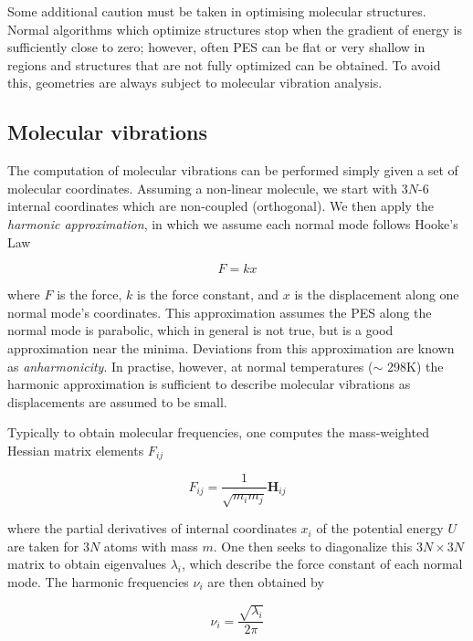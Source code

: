 Some additional caution must be taken in optimising molecular structures.
Normal algorithms which optimize structures stop when the gradient of energy is
sufficiently close to zero; however, often PES can be flat or very shallow in
regions and structures that are not fully optimized can be obtained. To avoid
this, geometries are always subject to molecular vibration analysis.

\subsection{Molecular vibrations}

The computation of molecular vibrations can be performed simply given a set of
molecular coordinates.\cite{Wilson1980} Assuming a non-linear molecule, we
start with 3$N$-6 internal coordinates which are non-coupled (orthogonal). We
then apply the \emph{harmonic approximation}, in which we assume each normal
mode follows Hooke's Law

\begin{equation}
  F = kx
\end{equation}


\noindent where $F$ is the force, $k$ is the force constant, and $x$ is the
displacement along one normal mode's coordinates. This approximation assumes
the PES along the normal mode is parabolic, which in general is not true, but
is a good approximation near the minima. Deviations from this approximation are
known as \emph{anharmonicity}. In practise, however, at normal temperatures
($\sim$ 298K) the harmonic approximation is sufficient to describe molecular
vibrations as displacements are assumed to be small.

Typically to obtain molecular frequencies, one computes the mass-weighted
Hessian matrix elements $F_{ij}$

\begin{equation}
  F_{ij} = \frac{1}{\sqrt{m_i m_j}} \mathbf{H}_{ij}
\end{equation}

\noindent where the partial derivatives of internal coordinates $x_i$ of the
potential energy $U$ are taken for 3$N$ atoms with mass $m$. One then seeks to
diagonalize this $3N\times3N$ matrix to obtain eigenvalues $\lambda_i$, which
describe the force constant of each normal mode. The harmonic frequencies
$\nu_i$ are then obtained by

\begin{equation}
  \nu_i = \frac{\sqrt{\lambda_i}}{2\pi}
\end{equation}

